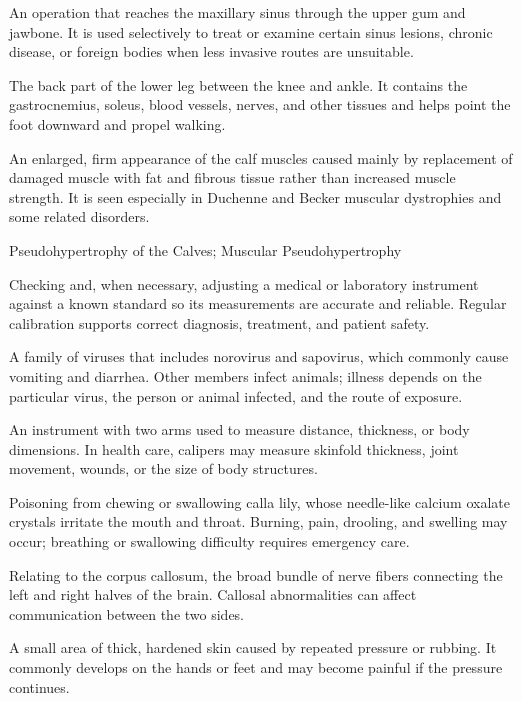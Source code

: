  An operation that reaches the maxillary sinus through the upper gum and jawbone. It is used selectively to treat or examine certain sinus lesions, chronic disease, or foreign bodies when less invasive routes are unsuitable.

 The back part of the lower leg between the knee and ankle. It contains the gastrocnemius, soleus, blood vessels, nerves, and other tissues and helps point the foot downward and propel walking.

 An enlarged, firm appearance of the calf muscles caused mainly by replacement of damaged muscle with fat and fibrous tissue rather than increased muscle strength. It is seen especially in Duchenne and Becker muscular dystrophies and some related disorders.

\synonyms
Pseudohypertrophy of the Calves; Muscular Pseudohypertrophy

 Checking and, when necessary, adjusting a medical or laboratory instrument against a known standard so its measurements are accurate and reliable. Regular calibration supports correct diagnosis, treatment, and patient safety.

 A family of viruses that includes norovirus and sapovirus, which commonly cause vomiting and diarrhea. Other members infect animals; illness depends on the particular virus, the person or animal infected, and the route of exposure.

 An instrument with two arms used to measure distance, thickness, or body dimensions. In health care, calipers may measure skinfold thickness, joint movement, wounds, or the size of body structures.

 Poisoning from chewing or swallowing calla lily, whose needle-like calcium oxalate crystals irritate the mouth and throat. Burning, pain, drooling, and swelling may occur; breathing or swallowing difficulty requires emergency care.

 Relating to the corpus callosum, the broad bundle of nerve fibers connecting the left and right halves of the brain. Callosal abnormalities can affect communication between the two sides.

 A small area of thick, hardened skin caused by repeated pressure or rubbing. It commonly develops on the hands or feet and may become painful if the pressure continues.

